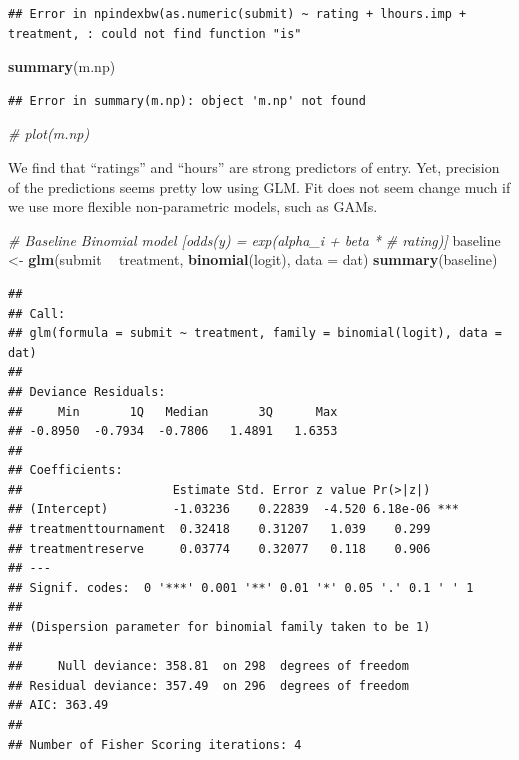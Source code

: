 \documentclass[]{article}
\newenvironment{Shaded}{\begin{snugshade}}{\end{snugshade}}
\newcommand{\KeywordTok}[1]{\textcolor[rgb]{0.13,0.29,0.53}{\textbf{#1}}}
\newcommand{\DataTypeTok}[1]{\textcolor[rgb]{0.13,0.29,0.53}{#1}}
\newcommand{\StringTok}[1]{\textcolor[rgb]{0.31,0.60,0.02}{#1}}
\newcommand{\CommentTok}[1]{\textcolor[rgb]{0.56,0.35,0.01}{\textit{#1}}}
\newcommand{\OperatorTok}[1]{\textcolor[rgb]{0.81,0.36,0.00}{\textbf{#1}}}
\newcommand{\NormalTok}[1]{#1}
\let\oldShaded\Shaded
\let\endoldShaded\endShaded
\renewenvironment{Shaded}{\footnotesize\oldShaded}{\endoldShaded}
\begin{document}
\begin{verbatim}
## Error in npindexbw(as.numeric(submit) ~ rating + lhours.imp + treatment, : could not find function "is"
\end{verbatim}

\begin{Shaded}
\begin{Highlighting}[]
\KeywordTok{summary}\NormalTok{(m.np)}
\end{Highlighting}
\end{Shaded}

\begin{verbatim}
## Error in summary(m.np): object 'm.np' not found
\end{verbatim}

\begin{Shaded}
\begin{Highlighting}[]
\CommentTok{# plot(m.np)}
\end{Highlighting}
\end{Shaded}

We find that ``ratings'' and ``hours'' are strong predictors of entry.
Yet, precision of the predictions seems pretty low using GLM. Fit does
not seem change much if we use more flexible non-parametric models, such
as GAMs.

\begin{Shaded}
\begin{Highlighting}[]
\CommentTok{# Baseline Binomial model [odds(y) = exp(alpha_i + beta *}
\CommentTok{# rating)]}
\NormalTok{baseline <-}\StringTok{ }\KeywordTok{glm}\NormalTok{(submit }\OperatorTok{~}\StringTok{ }\NormalTok{treatment, }\KeywordTok{binomial}\NormalTok{(logit), }\DataTypeTok{data =}\NormalTok{ dat)}
\KeywordTok{summary}\NormalTok{(baseline)}
\end{Highlighting}
\end{Shaded}

\begin{verbatim}
## 
## Call:
## glm(formula = submit ~ treatment, family = binomial(logit), data = dat)
## 
## Deviance Residuals: 
##     Min       1Q   Median       3Q      Max  
## -0.8950  -0.7934  -0.7806   1.4891   1.6353  
## 
## Coefficients:
##                     Estimate Std. Error z value Pr(>|z|)    
## (Intercept)         -1.03236    0.22839  -4.520 6.18e-06 ***
## treatmenttournament  0.32418    0.31207   1.039    0.299    
## treatmentreserve     0.03774    0.32077   0.118    0.906    
## ---
## Signif. codes:  0 '***' 0.001 '**' 0.01 '*' 0.05 '.' 0.1 ' ' 1
## 
## (Dispersion parameter for binomial family taken to be 1)
## 
##     Null deviance: 358.81  on 298  degrees of freedom
## Residual deviance: 357.49  on 296  degrees of freedom
## AIC: 363.49
## 
## Number of Fisher Scoring iterations: 4
\end{verbatim}
\end{document}
